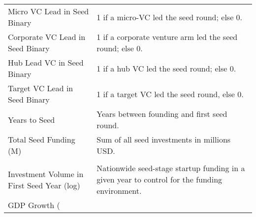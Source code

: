 {\begin{tabular}{p{} p{}}
Micro VC Lead in Seed Binary & 1 if a micro-VC led the seed round; else 0. \\[0.4em]
Corporate VC Lead in Seed Binary & 1 if a corporate venture arm led the seed round; else 0. \\[0.4em]
Hub Lead VC in Seed Binary & 1 if a hub VC led the seed round; else 0. \\[0.4em]
Target VC Lead in Seed Binary & 1 if a target VC led the seed round, else 0. \\[0.4em]
Years to Seed & Years between founding and first seed round. \\[0.4em]
Total Seed Funding (M) & Sum of all seed investments in millions USD. \\[0.4em]
\addlinespace[0.5em]
\midrule
\multicolumn{2}{c}{\tiny\textsc{CONTROL VARIABLES}} \\
\midrule
Investment Volume in First Seed Year (log) & Nationwide seed-stage startup funding in a given year to control for the funding environment. \\[0.4em]
GDP Growth (%
\bottomrule
\end{tabular}
}
